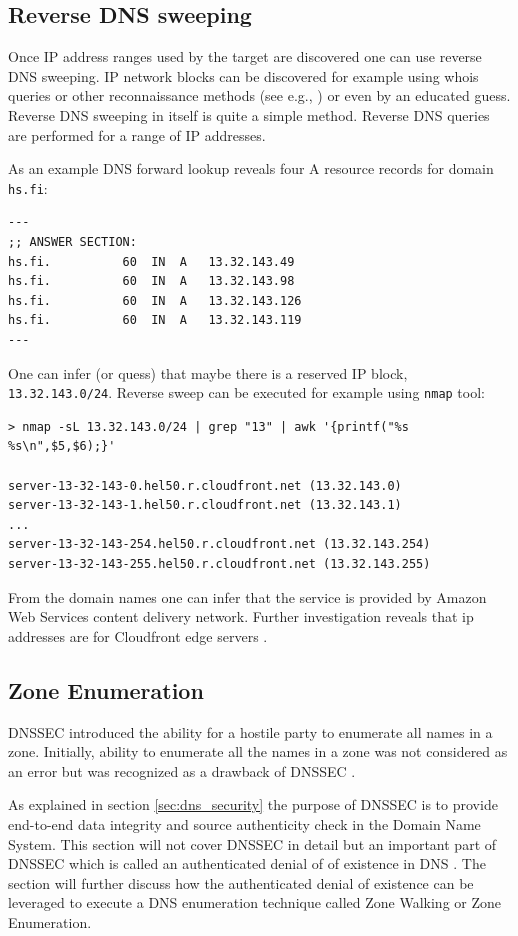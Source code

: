 \subsection{Reverse DNS sweeping}

Once IP address ranges used by the target are discovered one can use reverse DNS sweeping. IP network blocks can be discovered for example using whois queries or other reconnaissance methods (see e.g., \cite{network_sec_assessment}) or even by an educated guess. Reverse DNS sweeping in itself is quite a simple method. Reverse DNS queries are performed for a range of IP addresses. 

As an example DNS forward lookup reveals four A resource records for domain \texttt{hs.fi}:
\begin{verbatim}
---
;; ANSWER SECTION:
hs.fi.			60	IN	A	13.32.143.49
hs.fi.			60	IN	A	13.32.143.98
hs.fi.			60	IN	A	13.32.143.126
hs.fi.			60	IN	A	13.32.143.119
---
\end{verbatim}
One can infer (or quess) that maybe there is a reserved IP block, \texttt{13.32.143.0/24}. Reverse sweep can be executed for example using \texttt{nmap} tool:
\begin{verbatim}
> nmap -sL 13.32.143.0/24 | grep "13" | awk '{printf("%s %s\n",$5,$6);}'

server-13-32-143-0.hel50.r.cloudfront.net (13.32.143.0)
server-13-32-143-1.hel50.r.cloudfront.net (13.32.143.1)
...
server-13-32-143-254.hel50.r.cloudfront.net (13.32.143.254)
server-13-32-143-255.hel50.r.cloudfront.net (13.32.143.255)
\end{verbatim}

From the domain names one can infer that the service is provided by Amazon Web Services content delivery network. Further investigation reveals that ip addresses are for Cloudfront edge servers \cite{AWS}.

\subsection{Zone Enumeration}

DNSSEC introduced the ability for a hostile party to enumerate all names in a zone. Initially, ability to enumerate all the names in a zone was not considered as an error but was recognized as a drawback of DNSSEC \cite{RFC_4033}.

As explained in section \ref{sec:dns_security} the purpose of DNSSEC is to provide end-to-end data integrity and source authenticity check in the Domain Name System. This section will not cover DNSSEC in detail but an important part of DNSSEC which is called an authenticated denial of 
of existence in DNS  \cite{RFC_7129}. The section will further discuss how the authenticated denial of existence can be leveraged to execute a DNS enumeration technique called Zone Walking or Zone Enumeration.

